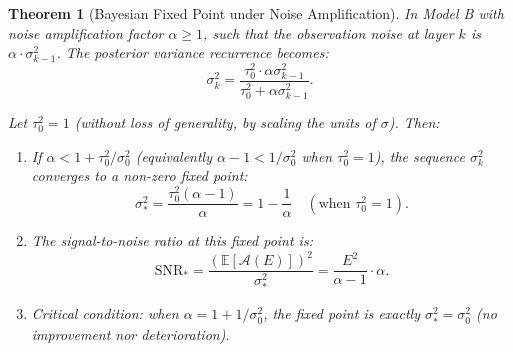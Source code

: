 \documentclass[12pt,a4paper]{article}
\newtheorem{theorem}{Theorem}[section]
\theoremstyle{definition}
\newcommand{\E}{\mathbb{E}}
\newcommand{\AuditOp}{\mathcal{A}}
\newcommand{\SNR}{\mathrm{SNR}}
\begin{document}
\begin{theorem}[Bayesian Fixed Point under Noise Amplification]\label{thm:model_b_amplified}
In Model B with noise amplification factor $\alpha \geq 1$, such that the observation noise at layer $k$ is $\alpha \cdot \sigma_{k-1}^2$. The posterior variance recurrence becomes:
\begin{equation}\label{eq:model_b_amplified_recurrence}
    \sigma_k^2 = \frac{\tau_0^2 \cdot \alpha \sigma_{k-1}^2}{\tau_0^2 + \alpha \sigma_{k-1}^2}.
\end{equation}

Let $\tau_0^2 = 1$ (without loss of generality, by scaling the units of $\sigma$). Then:
\begin{enumerate}[label=(\roman*), leftmargin=*]
    \item If $\alpha < 1 + \tau_0^2/\sigma_0^2$ (equivalently $\alpha - 1 < 1/\sigma_0^2$ when $\tau_0^2=1$), the sequence $\sigma_k^2$ converges to a non-zero fixed point:
    \begin{equation}\label{eq:nonzero_fixed_point}
        \sigma_*^2 = \frac{\tau_0^2(\alpha - 1)}{\alpha} = 1 - \frac{1}{\alpha} \quad (\text{when } \tau_0^2 = 1).
    \end{equation}
    \item The signal-to-noise ratio at this fixed point is:
    \begin{equation}\label{eq:snr_fixed_point}
        \SNR_* = \frac{(\E[\AuditOp(E)])^2}{\sigma_*^2} = \frac{E^2}{\alpha - 1} \cdot \alpha.
    \end{equation}
    \item Critical condition: when $\alpha = 1 + 1/\sigma_0^2$, the fixed point is exactly $\sigma_*^2 = \sigma_0^2$ (no improvement nor deterioration).
\end{enumerate}
\end{theorem}
\end{document}
